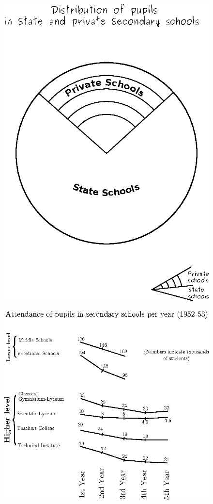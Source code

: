 \begin{figure}[H]
\centering
\includegraphics[scale=.9]{figure/fig_38d.eps}
\end{figure}

\begin{figure}[H]
\centering
\includegraphics[scale=.9]{figure/fig_38e.eps}
\end{figure}

